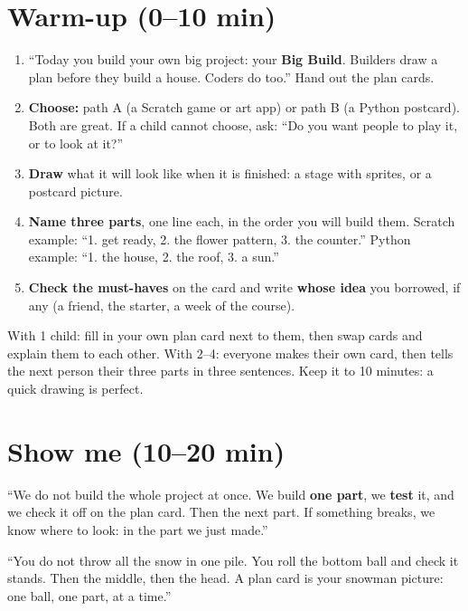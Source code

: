 \section{Warm-up (0--10 min)}
\begin{unplugged}
\begin{enumerate}[leftmargin=1.4em,itemsep=1pt]
  \item \enquote{Today you build your own big project: your \textbf{Big Build}. Builders draw a plan before they build a house. Coders do too.} Hand out the plan cards.
  \item \textbf{Choose:} path A (a Scratch game or art app) or path B (a Python postcard). Both are great. If a child cannot choose, ask: \enquote{Do you want people to play it, or to look at it?}
  \item \textbf{Draw} what it will look like when it is finished: a stage with sprites, or a postcard picture.
  \item \textbf{Name three parts}, one line each, in the order you will build them. Scratch example: \enquote{1. get ready, 2. the flower pattern, 3. the counter.} Python example: \enquote{1. the house, 2. the roof, 3. a sun.}
  \item \textbf{Check the must-haves} on the card and write \textbf{whose idea} you borrowed, if any (a friend, the starter, a week of the course).
\end{enumerate}
With 1 child: fill in your own plan card next to them, then swap cards and explain them to each other. With 2--4: everyone makes their own card, then tells the next person their three parts in three sentences. Keep it to 10 minutes: a quick drawing is perfect.
\end{unplugged}

\section{Show me (10--20 min)}
\begin{teacherscript}
\enquote{We do not build the whole project at once. We build \textbf{one part}, we \textbf{test} it, and we check it off on the plan card. Then the next part. If something breaks, we know where to look: in the part we just made.}
\end{teacherscript}

\begin{analogy}
\enquote{You do not throw all the snow in one pile. You roll the bottom ball and check it stands. Then the middle, then the head. A plan card is your snowman picture: one ball, one part, at a time.}
\end{analogy}

